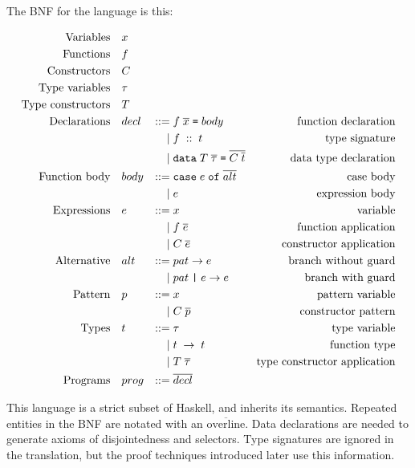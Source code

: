 The BNF for the language is this:

\begin{equation*}
\begin{aligned}
\text{Variables} \quad & x \\
\text{Functions} \quad & f \\
\text{Constructors} \quad & C \\
\text{Type variables} \quad & \tau \\
\text{Type constructors} \quad & T \\
\text{Declarations}\quad&decl&::=&\; f \; \overline{x} \; \texttt{=} \; body&\text{function declaration} \\
    &&|&\;f \; :: \; t&\text{type signature} \\
    &&|&\;\texttt{data} \; T \; \overline{\tau} \; \texttt{=} \; \overline{C \; \overline{t}}&\text{data type declaration} \\
\text{Function body}\quad&body&::=&\;\texttt{case} \; e \; \texttt{of} \; \overline{alt}&\text{case body} \\
    &&|&\;e&\text{expression body} \\
\text{Expressions}\quad&e&::=&\;x&\text{variable} \\
    &&|&\;f \; \overline{e}&\text{function application} \\
    &&|&\;C \; \overline{e}&\text{constructor application} \\
\text{Alternative}\quad&alt&::=&\;pat \rightarrow e&\text{branch without guard} \\
    &&|&\;pat \; \texttt{|} \; e \rightarrow e&\text{branch with guard} \\
\text{Pattern}\quad&p&::=&\;x&\text{pattern variable} \\
    &&|&\;C \; \overline{p}&\text{constructor pattern} \\
\text{Types}\quad&t&::=&\;\tau&\text{type variable} \\
    &&|&\;t \; \rightarrow \; t&\text{function type} \\
    &&|&\;T \; \overline{\tau}&\text{type constructor application} \\
\text{Programs}\quad&prog&::=&\;\overline{decl}&\text{} \\
\end{aligned}
\end{equation*}

This language is a strict subset of Haskell, and inherits its
semantics.  Repeated entities in the BNF are notated with an
$\overline{\text{overline}}$.  Data declarations are needed to
generate axioms of disjointedness and selectors. Type signatures are
ignored in the translation, but the proof techniques introduced later
use this information.

